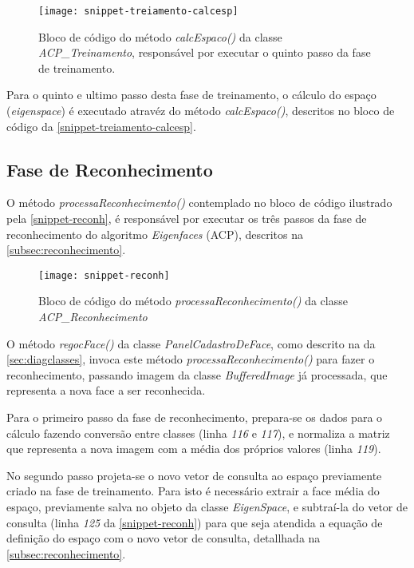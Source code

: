 \begin{figure}[h]
	\centering
	\texttt{[image: snippet-treiamento-calcesp]}
	\caption{Bloco de código do método \textit{calcEspaco()} da classe \textit{ACP\_Treinamento}, responsável por executar o quinto passo da fase de treinamento.}
	\label{snippet-treiamento-calcesp}
\end{figure}

Para o quinto e ultimo passo desta fase de treinamento, o cálculo do espaço (\textit{eigenspace}) é executado atravéz do método \textit{calcEspaco()}, descritos no bloco de código da \autoref{snippet-treiamento-calcesp}. 





\subsection{Fase de Reconhecimento}\label{sec:implrecog}

O método \textit{processaReconhecimento()} contemplado no bloco de código ilustrado pela \autoref{snippet-reconh}, é responsável por executar os três passos da fase de reconhecimento do algoritmo \textit{Eigenfaces} (ACP), descritos na \autoref{subsec:reconhecimento}.

\begin{figure}[h]
	\centering
	\texttt{[image: snippet-reconh]}
	\caption{Bloco de código do método \textit{processaReconhecimento()} da classe \textit{ACP\_Reconhecimento}}
	\label{snippet-reconh}
\end{figure}


O método \textit{regocFace()} da classe \textit{PanelCadastroDeFace}, como descrito na da \autoref{sec:diagclasses}, invoca este método \textit{processaReconhecimento()} para fazer o reconhecimento, passando imagem da classe \textit{BufferedImage} já processada, que representa a nova face a ser reconhecida. 

Para o primeiro passo da fase de reconhecimento, prepara-se os dados para o cálculo fazendo conversão entre classes (linha \textit{116} e \textit{117}), e normaliza a matriz que representa a nova imagem com a média dos próprios valores (linha \textit{119}).

No segundo passo projeta-se o novo vetor de consulta ao espaço previamente criado na fase de treinamento. Para isto é necessário extrair a face média do espaço, previamente salva no objeto da classe \textit{EigenSpace}, e subtraí-la do vetor de consulta (linha \textit{125} da \autoref{snippet-reconh}) para que seja atendida a equação de definição do espaço com o novo vetor de consulta, detallhada  na \autoref{subsec:reconhecimento}. 

